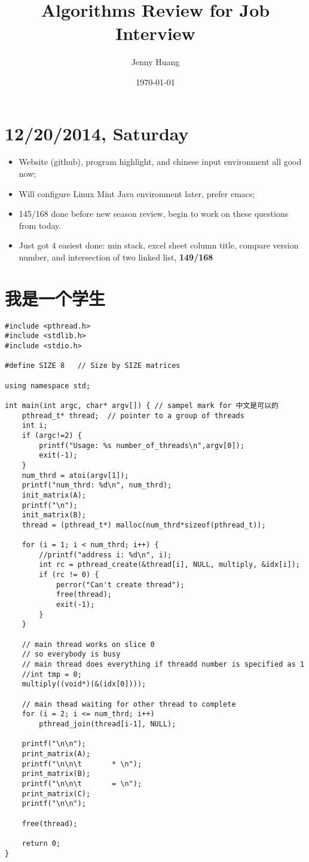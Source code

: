 \documentclass[9pt,b5paper]{article}
\author{Jenny Huang}
\date{\today}
\title{Algorithms Review for Job Interview}
\begin{document}
\maketitle
\tableofcontents


\section{12/20/2014, Saturday}
\label{sec-1}
\begin{itemize}
\item Website (github), program highlight, and chinese input environment all good now;
\item Will configure Linux Mint Java environment later, prefer emacs;
\item 145/168 done before new season review, begin to work on these questions from today.
\item Just got 4 easiest done: min stack, excel sheet column title, compare version number, and intersection of two linked list, \textbf{149/168}
\end{itemize}

\section{我是一个学生}
\label{sec-2}
\begin{verbatim}
#include <pthread.h>
#include <stdlib.h>
#include <stdio.h>

#define SIZE 8   // Size by SIZE matrices

using namespace std;

int main(int argc, char* argv[]) { // sampel mark for 中文是可以的
    pthread_t* thread;  // pointer to a group of threads
    int i;
    if (argc!=2) {    
        printf("Usage: %s number_of_threads\n",argv[0]);
        exit(-1);
    }
    num_thrd = atoi(argv[1]);
    printf("num_thrd: %d\n", num_thrd);
    init_matrix(A);
    printf("\n");
    init_matrix(B);
    thread = (pthread_t*) malloc(num_thrd*sizeof(pthread_t));

    for (i = 1; i < num_thrd; i++) {    
        //printf("address i: %d\n", i);
        int rc = pthread_create(&thread[i], NULL, multiply, &idx[i]);
        if (rc != 0) {
            perror("Can't create thread");
            free(thread);
            exit(-1);
        }
    }

    // main thread works on slice 0
    // so everybody is busy
    // main thread does everything if threadd number is specified as 1
    //int tmp = 0;
    multiply((void*)(&(idx[0])));

    // main thead waiting for other thread to complete
    for (i = 2; i <= num_thrd; i++)
        pthread_join(thread[i-1], NULL);

    printf("\n\n");
    print_matrix(A);
    printf("\n\n\t       * \n");
    print_matrix(B);
    printf("\n\n\t       = \n");
    print_matrix(C);
    printf("\n\n");

    free(thread);

    return 0;
}
\end{verbatim}
\end{document}
